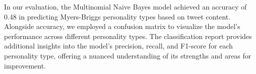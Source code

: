 \documentclass[twoside,11pt]{article}
\begin{document}
In our evaluation, the Multinomial Naive Bayes model achieved an accuracy of 0.48 in predicting Myers-Briggs personality types based on tweet content. Alongside accuracy, we employed a confusion matrix to visualize the model's performance across different personality types. The classification report provides additional insights into the model's precision, recall, and F1-score for each personality type, offering a nuanced understanding of its strengths and areas for improvement.

\vskip 0.2in

\end{document}
